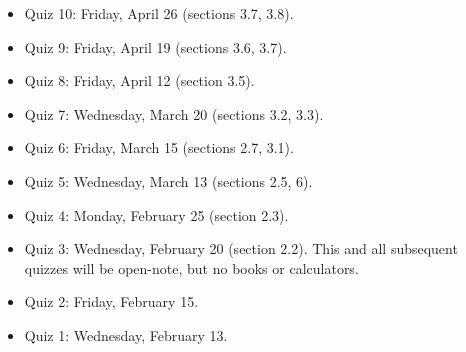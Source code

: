 \begin{itemize}
\item Quiz 10: Friday, April 26 (sections 3.7, 3.8).

\item Quiz 9: Friday, April 19 (sections 3.6, 3.7).

\item Quiz 8: Friday, April 12 (section 3.5).

\item Quiz 7: Wednesday, March 20 (sections 3.2, 3.3).

\item Quiz 6: Friday, March 15 (sections 2.7, 3.1).

\item Quiz 5: Wednesday, March 13 (sections 2.5, 6).

\item Quiz 4: Monday, February 25 (section 2.3).

\item Quiz 3: Wednesday, February 20 (section 2.2). This and all subsequent quizzes will be open-note, but no books or calculators.

\item Quiz 2: Friday, February 15.

\item Quiz 1: Wednesday, February 13.

\end{itemize}




